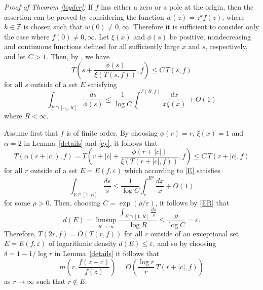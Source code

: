\documentclass{amsart}
\newcommand{\Z}{\mathbb{Z}}
\theoremstyle{definition}
\numberwithin{equation}{section}
\numberwithin{theorem}{section}
\begin{document}
\noindent\textit{Proof of Theorem \ref{logder}: } If $f$ has
either a zero or a pole at the origin, then the assertion can be
proved by considering the function $w(z)=z^k f (z)$, where
$k\in\Z$ is chosen such that $w(0)\not=0,\infty$. Therefore it is
sufficient to consider only the case where $f(0)\not=0,\infty$.
Let $\xi(x)$ and $\phi(s)$ be positive, nondecreasing and
continuous functions defined for all sufficiently large $x$ and
$s$, respectively, and let $C>1$. Then, by \cite[Lemma
3.3.1]{cherryy:01}, we have
    \begin{equation}\label{cy}
    T\left(s+\frac{\phi(s)}{\xi(T(s,f))},f\right) \leq C\,T(s,f)
    \end{equation}
for all $s$ outside of a set $E$ satisfying
    \begin{equation}\label{E}
    \int_{E\cap [s_0,R]} \frac{ds}{\phi(s)} \leq  \frac{1}{\log
     C}\int_e^{T(R,f)}\frac{dx}{x\xi(x)} +O(1)
    \end{equation}
where $R<\infty$.

Assume first that $f$ is of finite order. By choosing $\phi(r)=
r$, $\xi(x)=1$ and $\alpha=2$ in Lemma~\ref{details} and
\eqref{cy}, it follows that
    \begin{equation}\label{gT}
    T(\alpha(r+|c|),f) =  T\left(r+|c|+\frac{\phi(r+|c|)}{\xi(T(r+|c|,f))},f\right) \leq C\, T(r+|c|,f)
    \end{equation}
for all $r$ outside of a set $E=E(f,\varepsilon)$ which according to \eqref{E}
satisfies
    \begin{equation}\label{ER}
    \int_{E\cap [1,R]} \frac{ds}{s} \leq  \frac{1}{\log
     C}\int_e^{R^\rho}\frac{dx}{x} +O(1)
    \end{equation}
for some $\rho>0$. Then, choosing
$C=\exp(\rho/\varepsilon)$, it follows by \eqref{ER} that
    \begin{equation*}
    d(E)=\limsup_{R\to\infty}\frac{\int_{E\cap [1,R]} \frac{ds}{s}}{\log R} \leq  \frac{\rho}{\log
     C} = \varepsilon.
    \end{equation*}
Therefore, $T(2r,f)=O(T(r,f))$ for all $r$ outside of an exceptional set $E=E(f,\varepsilon)$ of logarithmic
density $d(E)\leq \varepsilon$, and so by choosing $\delta=1-1/\log r$ in
Lemma~\ref{details} it follows that
    \begin{equation}\label{m2}
    m\left(r,\frac{f(z+c)}{f(z)}\right) =O\left(
    \frac{\log r}{r}\,T(r+|c|,f)\right)
    \end{equation}
as $r\to\infty$ such that $r\not\in E$.
\end{document}
